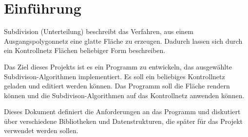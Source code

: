\chapter{Einführung}

Subdivision (Unterteilung) beschreibt das Verfahren, aus einem Ausgangspolygonnetz eine glatte Fläche zu erzeugen.
Dadurch lassen sich durch ein Kontrollnetz Flächen beliebiger Form beschreiben.

Das Ziel dieses Projekts ist es ein Programm zu entwickeln, das ausgewählte Subdivison-Algorithmen implementiert.
Es soll ein beliebiges Kontrollnetz geladen und editiert werden können.
Das Programm soll die Fläche rendern können und die Subdivison-Algorithmen auf das Kontrollnetz anwenden können.

Dieses Dokument definiert die Anforderungen an das Programm und diskutiert über verschiedene Bibliotheken und Datenstrukturen,
die später für das Projekt verwendet werden sollen.